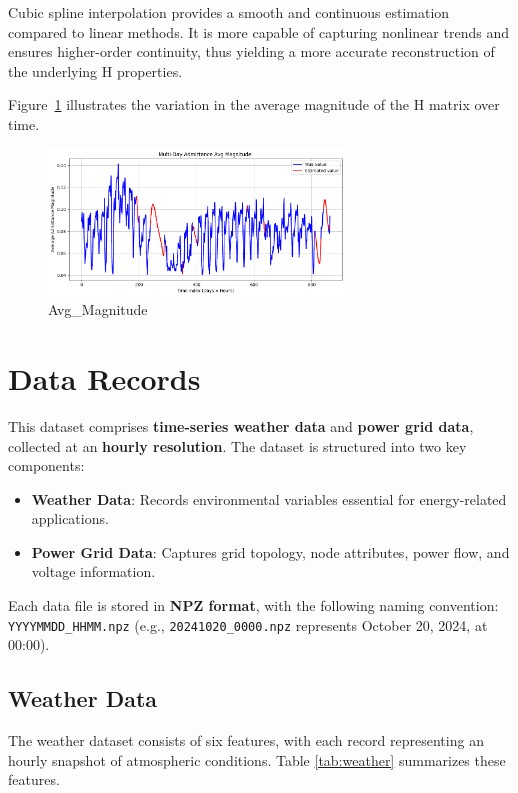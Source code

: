 \documentclass[12pt]{article}
\begin{document}
Cubic spline interpolation provides a smooth and continuous estimation compared to linear methods. It is more capable of capturing nonlinear trends and ensures higher-order continuity, thus yielding a more accurate reconstruction of the underlying H properties.

Figure~\ref{fig:Avg_Magnitude} illustrates the variation in the average magnitude of the H matrix over time. 

\begin{figure}[H]
    \centering
    \includegraphics[width=0.7\textwidth]{picture/Avg_Magnitude.png}
    \caption{Avg\_Magnitude}
\label{fig:Avg_Magnitude}
\end{figure}

\section*{Data Records}

This dataset comprises \textbf{time-series weather data} and \textbf{power grid data}, collected at an \textbf{hourly resolution}. The dataset is structured into two key components:
\begin{itemize}
    \item \textbf{Weather Data}: Records environmental variables essential for energy-related applications.
    \item \textbf{Power Grid Data}: Captures grid topology, node attributes, power flow, and voltage information.
\end{itemize}
Each data file is stored in \textbf{NPZ format}, with the following naming convention: \texttt{YYYYMMDD\_HHMM.npz} (e.g., \texttt{20241020\_0000.npz} represents October 20, 2024, at 00:00).

\subsection*{Weather Data}
The weather dataset consists of six features, with each record representing an hourly snapshot of atmospheric conditions. Table \ref{tab:weather} summarizes these features.
\end{document}
